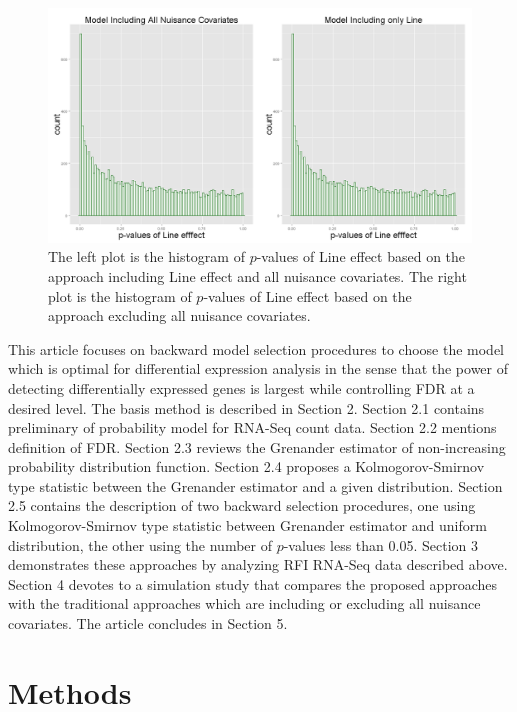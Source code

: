 \documentclass[12pt, letter]{article}\usepackage[]{graphicx}\usepackage[]{color}
\begin{document}
\begin{figure}[H]
\centering
\includegraphics[scale = 0.22]{intro_plot.png}
\caption{The left plot is the histogram of $p$-values of Line effect based on the approach including Line effect and all nuisance covariates. The right plot is the histogram of $p$-values of Line effect based on the approach excluding all nuisance covariates.}
\label{figure1}
\end{figure}

This article focuses on backward model selection procedures to  choose the model which is  optimal for differential expression analysis in the sense that the power of detecting differentially expressed genes is largest while controlling FDR at a desired level. The basis method is described in Section 2. Section 2.1 contains preliminary of probability model for RNA-Seq count data. Section 2.2 mentions definition of FDR.  Section 2.3 reviews the Grenander estimator of non-increasing probability distribution function. Section 2.4 proposes a Kolmogorov-Smirnov  type statistic between the Grenander estimator and a given distribution. Section 2.5 contains the description of two backward selection procedures, one using Kolmogorov-Smirnov  type statistic between Grenander estimator and uniform distribution, the other using the number of $p$-values less than 0.05. Section 3 demonstrates these approaches by analyzing RFI RNA-Seq data described above. Section 4 devotes to a simulation study that compares the proposed approaches with the traditional approaches which are including or excluding all nuisance covariates. The article concludes in Section 5. 
\section{ Methods}
\end{document}

